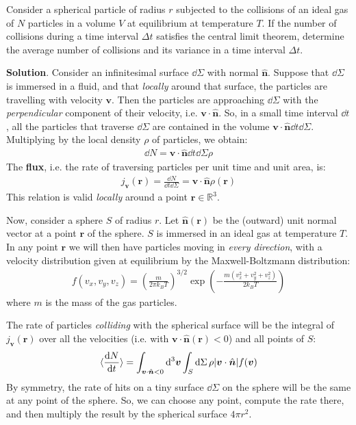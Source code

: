 \documentclass[../template.tex]{subfiles}
\begin{document}
\begin{exo}
    Consider a spherical particle of radius $r$ subjected to the collisions of an ideal gas of $N$ particles in a volume $V$ at equilibrium at temperature $T$. If the number of collisions during a time interval $\Delta t$ satisfies the central limit theorem, determine the average number of collisions and its variance in a time interval $\Delta t$.

    \medskip

    \textbf{Solution}. Consider an infinitesimal surface $\dd{\Sigma}$ with normal $\hat{\bm{n}}$. Suppose that $\dd{\Sigma}$ is immersed in a fluid, and that \textit{locally} around that surface, the particles are travelling with velocity $\bm{v}$. Then the particles are approaching $\dd{\Sigma}$ with the \textit{perpendicular} component of their velocity, i.e. $\bm{\bm{v}}\cdot\hat{\bm{n}}$. So, in a small time interval $\dd{t}$, all the particles that traverse $\dd{\Sigma}$ are contained in the volume $\bm{v} \cdot \hat{\bm{n}} \dd{t} \dd{\Sigma}$. Multiplying by the local density $\rho$ of particles, we obtain:
    \begin{align*}
        \dd{N} = \bm{v} \cdot \hat{\bm{n}} \dd{t} \dd{\Sigma} \rho
    \end{align*}
    The \textbf{flux}, i.e. the rate of traversing particles per unit time and unit area, is:
    \begin{align*}
        j_{\bm{v}}(\bm{r}) = \frac{\dd{N}}{\dd{t}\dd{\Sigma}} = \bm{v}\cdot \hat{\bm{n}} \rho (\bm{r})
    \end{align*}
    This relation is valid \textit{locally} around a point $\bm{r} \in \mathbb{R}^3$.
    
    Now, consider a sphere $S$ of radius $r$. Let $\hat{\bm{n}}(\bm{r})$ be the (outward) unit normal vector at a point $\bm{r}$ of the sphere. $S$ is immersed in an ideal gas at temperature $T$. In any point $\bm{r}$ we will then have particles moving in \textit{every direction}, with a velocity distribution given at equilibrium by the Maxwell-Boltzmann distribution:
    \begin{align*}
        f(v_x,v_y,v_z) = \left(\frac{m}{2 \pi k_B T} \right)^{3/2} \exp\left(-\frac{m(v_x^2 + v_y^2 + v_z^2)}{2 k_B T} \right)
    \end{align*}
    where $m$ is the mass of the gas particles. 
    
    The rate of particles \textit{colliding} with the spherical surface will be the integral of $j_{\bm{v}}(\bm{r})$ over all the velocities  (i.e. with $\bm{v} \cdot \hat{\bm{n}}(\bm{r}) < 0$) and all points of $S$:
    \begin{align*}
        \langle \dv{N}{t}  \rangle = \int_{\bm{v} \cdot \hat{\bm{n}} < 0} \dd[3]{\bm{v}} \int_{S}  \dd{\Sigma}\rho |\bm{v} \cdot \hat{\bm{n}}| f(\bm{v}) 
    \end{align*}
    By symmetry, the rate of hits on a tiny surface $\dd{\Sigma}$ on the sphere will be the same at any point of the sphere. So, we can choose any point, compute the rate there, and then multiply the result by the spherical surface $4 \pi r^2$.


\end{exo}
\end{document}

